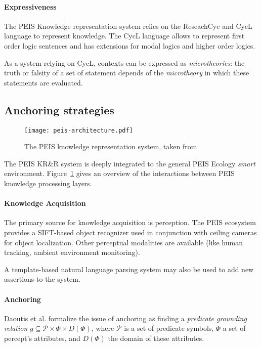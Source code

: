 \documentclass[a4paper]{article}
\begin{document}
\paragraph{Expressiveness} The PEIS Knowledge representation system relies on
the {\sc ReseachCyc} and {\sc CycL} language to represent knowledge. The {\sc CycL} language
allows to represent first order logic sentences and has extensions for modal logics and higher order logics.


As a system relying on {\sc CycL}, contexts can be expressed as
\emph{microtheories}: the truth or falsity of a set of statement depends of the
\emph{microtheory} in which these statements are evaluated.


\subsection{Anchoring strategies}
\label{sect|peis-anchoring}

\begin{figure}
	\centering
	\texttt{[image: peis-architecture.pdf]}
	\caption{The PEIS knowledge representation system, taken from~\cite{Daoutis2009}}
	\label{fig|peis-archi}
\end{figure}

The PEIS KR\&R system is deeply integrated to the general PEIS Ecology
\emph{smart} environment. Figure~\ref{fig|peis-archi} gives an overview of the
interactions between PEIS knowledge processing layers.

\paragraph{Knowledge Acquisition} The primary source for knowledge acquisition
is perception.  The PEIS ecosystem provides a SIFT-based object recognizer used
in conjunction with ceiling cameras for object localization.  Other perceptual
modalities are available (like human tracking, ambient environment monitoring).

A template-based natural language parsing system may also be used to add new
assertions to the system.

\paragraph{Anchoring} Daoutis et al. formalize the issue of anchoring as
finding a \emph{predicate grounding relation} $g \subseteq \mathcal{P} \times
\Phi \times D(\Phi)$, where $\mathcal{P}$ is a set of predicate symbols, $\Phi$
a set of percept's attributes, and $D(\Phi)$ the domain of these attributes.
\end{document}
